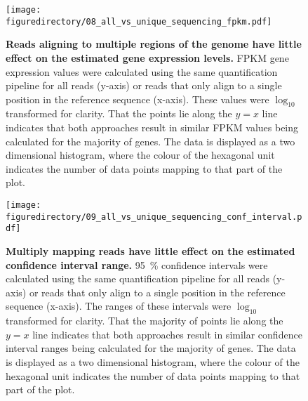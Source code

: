 \documentclass[12pt,]{book}
\begin{document}
\begin{figure}[htbp]
\centering
\texttt{[image: figuredirectory/08\_all\_vs\_unique\_sequencing\_fpkm.pdf]}
\caption{\textbf{Reads aligning to multiple regions of the genome have
little effect on the estimated gene expression levels.} FPKM gene
expression values were calculated using the same quantification pipeline
for all reads (y-axis) or reads that only align to a single position in
the reference sequence (x-axis). These values were \(\log_{10}\)
transformed for clarity. That the points lie along the \(y = x\) line
indicates that both approaches result in similar FPKM values being
calculated for the majority of genes. The data is displayed as a two
dimensional histogram, where the colour of the hexagonal unit indicates
the number of data points mapping to that part of the
plot.}\label{figure:208:uniquefpkm}
\end{figure}

\begin{figure}[htbp]
\centering
\texttt{[image: figuredirectory/09\_all\_vs\_unique\_sequencing\_conf\_interval.pdf]}
\caption{\textbf{Multiply mapping reads have little effect on the
estimated confidence interval range.} 95~\% confidence intervals were
calculated using the same quantification pipeline for all reads (y-axis)
or reads that only align to a single position in the reference sequence
(x-axis). The ranges of these intervals were \(\log_{10}\) transformed
for clarity. That the majority of points lie along the \(y = x\) line
indicates that both approaches result in similar confidence interval
ranges being calculated for the majority of genes. The data is displayed
as a two dimensional histogram, where the colour of the hexagonal unit
indicates the number of data points mapping to that part of the
plot.}\label{figure:209:uniqueconf}
\end{figure}
\end{document}
